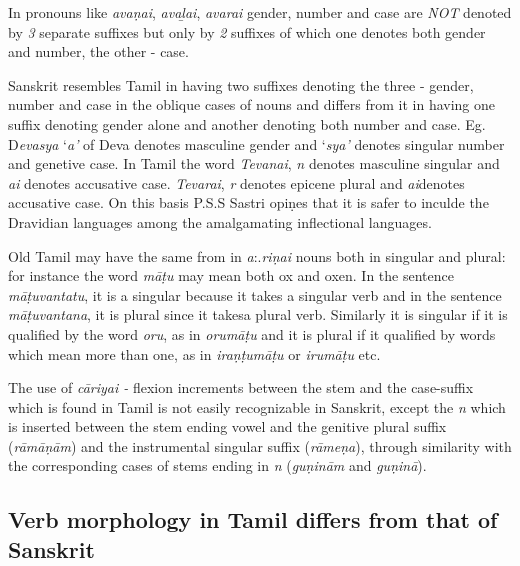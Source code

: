 \vskip 2pt

In pronouns like \textit{avaṇai}, \textit{avaḻai}, \textit{avarai} gender, number and case are \textit{NOT} denoted by \textit{3} separate suffixes but only by\textit{ 2} suffixes of which one denotes both gender and number, the other - case.

\vskip 2pt

Sanskrit resembles Tamil in having two suffixes denoting the three - gender, number and case in the oblique cases of nouns and differs from it in having one suffix denoting gender alone and another denoting both number and case. Eg. D\textit{evasya} ‘\textit{a’} of Deva denotes masculine gender and ‘\textit{sya’} denotes singular number and genetive case. In Tamil the word \textit{Tevanai},\textit{ n} denotes masculine singular and \textit{ai} denotes accusative case. \textit{Tevarai}, \textit{r} denotes epicene plural and \textit{ai}denotes accusative case. On this basis P.S.S Sastri opiṇes that it is safer to inculde the Dravidian languages among the amalgamating inflectional languages.

\vskip 2pt

Old Tamil may have the same from in \textit{a}:.\textit{riṇai} nouns both in singular and plural: for instance the word \textit{māṭu} may mean both ox and oxen. In the sentence \textit{māṭuvantatu}, it is a singular because it takes a singular verb and in the sentence \textit{māṭuvantana}, it is plural since it takesa plural verb. Similarly it is singular if it is qualified by the word \textit{oru}, as in \textit{orumāṭu} and it is plural if it qualified by words which mean more than one, as in \textit{iraṇṭumāṭu} or \textit{irumāṭu} etc.

The use of \textit{cāriyai -} flexion increments between the stem and the case-suffix which is found in Tamil is not easily recognizable in Sanskrit, except the \textit{n} which is inserted between the stem ending vowel and the genitive plural suffix (\textit{rāmāṇām}) and the instrumental singular suffix (\textit{rāmeṇa}), through similarity with the corresponding cases of stems ending in \textit{n} (\textit{guṇinām} and \textit{guṇinā}).

\subsection*{Verb morphology in Tamil differs from that of Sanskrit}

